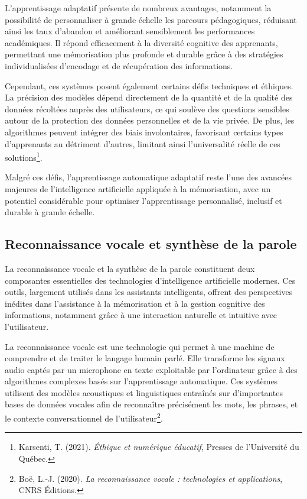 \documentclass[11pt,a4paper]{report}
\begin{document}
L’apprentissage adaptatif présente de nombreux avantages, notamment la possibilité de personnaliser à grande échelle les parcours pédagogiques, réduisant ainsi les taux d’abandon et améliorant sensiblement les performances académiques. Il répond efficacement à la diversité cognitive des apprenants, permettant une mémorisation plus profonde et durable grâce à des stratégies individualisées d'encodage et de récupération des informations.

Cependant, ces systèmes posent également certains défis techniques et éthiques. La précision des modèles dépend directement de la quantité et de la qualité des données récoltées auprès des utilisateurs, ce qui soulève des questions sensibles autour de la protection des données personnelles et de la vie privée. De plus, les algorithmes peuvent intégrer des biais involontaires, favorisant certains types d'apprenants au détriment d’autres, limitant ainsi l'universalité réelle de ces solutions\footnote{Karsenti, T. (2021). \textit{Éthique et numérique éducatif}, Presses de l’Université du Québec.}.

Malgré ces défis, l’apprentissage automatique adaptatif reste l'une des avancées majeures de l’intelligence artificielle appliquée à la mémorisation, avec un potentiel considérable pour optimiser l’apprentissage personnalisé, inclusif et durable à grande échelle.

\subsection{Reconnaissance vocale et synthèse de la parole}

La reconnaissance vocale et la synthèse de la parole constituent deux composantes essentielles des technologies d’intelligence artificielle modernes. Ces outils, largement utilisés dans les assistants intelligents, offrent des perspectives inédites dans l’assistance à la mémorisation et à la gestion cognitive des informations, notamment grâce à une interaction naturelle et intuitive avec l’utilisateur.

La reconnaissance vocale est une technologie qui permet à une machine de comprendre et de traiter le langage humain parlé. Elle transforme les signaux audio captés par un microphone en texte exploitable par l’ordinateur grâce à des algorithmes complexes basés sur l’apprentissage automatique. Ces systèmes utilisent des modèles acoustiques et linguistiques entraînés sur d’importantes bases de données vocales afin de reconnaître précisément les mots, les phrases, et le contexte conversationnel de l’utilisateur\footnote{Boë, L.-J. (2020). \textit{La reconnaissance vocale : technologies et applications}, CNRS Éditions.}.
\end{document}

